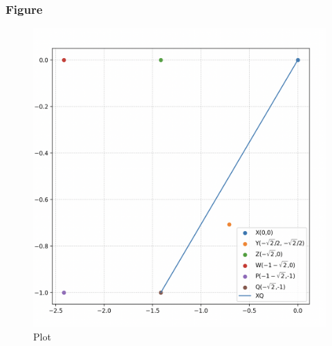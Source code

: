 \documentclass{beamer}
\begin{document}
\begin{frame}[fragile]
    \frametitle{Figure}
\begin{figure}[H]
    \centering
    \includegraphics[width=0.6\columnwidth]{Figs/1218.png}
    \caption{Plot}
    \label{fig:placeholder}
\end{figure}
\end{frame}
\end{document}

